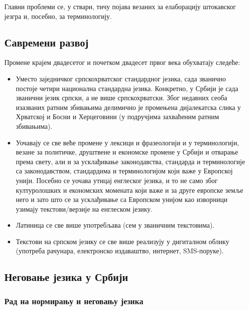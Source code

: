 \begin{multicols}{2}

Главни проблеми се, у ствари, тичу појава везаних за елаборацију штокавског језгра и, посебно, за терминологију.





\subsection {Савремени развој}
  
Промене крајем двадесетог и почетком двадесет првог века обухватају следеће:
\begin{itemize}
 \item Уместо заједничког српскохрватског стандардног језика, сада званично постоје четири национална стандардна језика. Конкретно, у Србији је сада званични језик српски, а не више српскохрватски. Због недавних сеоба изазваних ратним збивањима делимично је промењена дијалекатска слика у Хрватској и Босни и Херцеговини (у подручјима захваћеним ратним збивањима). 
\item Уочавају се све веће промене у лексици и фразеологији и у терминологији, везане за политичке, друштвене и економске промене у Србији и отварање према свету, али и за усклађивање законодавства, стандарда и терминологије са законодавством, стандардима и терминологијом који важе у Европској унији. Посебно се уочава утицај енглеског језика, и то не само због културолошких и економских момената који важе и за друге европске земље него и зато што се за усклађивање са Европском унијом као изворници узимају текстови/верзије на енглеском језику. 
\item Латиница се све више употребљава (сем у званичним текстовима).
\item Текстови на српском језику се све више реализују у дигиталном облику (употреба рачунара, електронско издаваштво, интернет, SMS-поруке). 
\end{itemize}

\subsection {Неговање језика у Србији}

\subsubsection{Рад на нормирању и неговању језика}   


\end{multicols}
